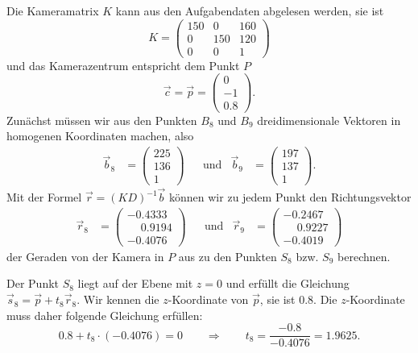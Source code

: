 \begin{loesung}
\begin{teilaufgaben}
\item
Die Kameramatrix $K$ kann aus den Aufgabendaten abgelesen werden, sie ist
\[
K
=
\begin{pmatrix}
150&  0&160\\
  0&150&120\\
  0&  0&  1
\end{pmatrix}
\]
und das Kamerazentrum entspricht dem Punkt $P$
\[
\vec c = \vec p = 
\begin{pmatrix}
0\\ -1\\ 0.8
\end{pmatrix}.
\]
Zunächst müssen wir aus den Punkten $B_8$ und $B_9$ dreidimensionale Vektoren
in homogenen Koordinaten machen, also
\[
\begin{aligned}
\vec b_8 &= \begin{pmatrix}225\\136\\1\end{pmatrix}
&&\text{und}&
\vec b_9 &= \begin{pmatrix}197\\137\\1\end{pmatrix}.
\end{aligned}
\]
Mit der Formel $\vec{r} = (KD)^{-1} \vec b$ können wir zu jedem Punkt
den Richtungsvektor
\[
\begin{aligned}
\vec r_8
&=
\begin{pmatrix}
-0.4333 \\
\phantom{-}0.9194 \\
-0.4076
\end{pmatrix}
&&\text{und}&
\vec r_9 &= 
\begin{pmatrix}
-0.2467 \\
\phantom{-}0.9227 \\
-0.4019
\end{pmatrix}
\end{aligned}
\]
der Geraden von der Kamera in $P$ aus zu den Punkten $S_8$ bzw. $S_9$ berechnen.

Der Punkt $S_8$ liegt auf der Ebene mit $z=0$ und erfüllt die
Gleichung $\vec s_8 = \vec {p} + t_8\vec{r}_8$.
Wir kennen die $z$-Koordinate von $\vec{p}$, sie ist $0.8$.
Die $z$-Koordinate muss daher folgende Gleichung erfüllen:
\[
0.8 + t_8\cdot (-0.4076) = 0
\qquad\Rightarrow\qquad
t_8 = \frac{-0.8}{-0.4076}=1.9625.
\]


\end{teilaufgaben}
\end{loesung}
